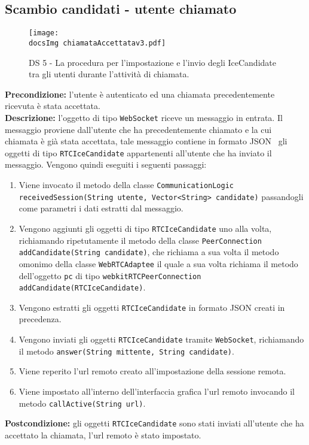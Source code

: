 \begin{sloppypar}
\subsection{Scambio candidati - utente chiamato}
\begin{center}
				\begin{figure}[h!tbp]
					\centering
					\texttt{[image: \\docsImg  chiamataAccettatav3.pdf]}
				\caption{DS 5 - La procedura per l'impostazione e l'invio degli IceCandidate tra gli utenti durante l'attività di chiamata.}	
				\end{figure}
			\end{center}
\noindent \textbf{Precondizione: }l'utente è autenticato ed una chiamata precedentemente ricevuta è stata accettata.\\
\textbf{Descrizione: }l'oggetto di tipo \texttt{WebSocket} riceve un messaggio in entrata. Il messaggio proviene dall'utente che ha precedentemente chiamato e la cui chiamata è già stata accettata, tale messaggio contiene in formato JSON\g~ gli oggetti di tipo \texttt{RTCIceCandidate} appartenenti all'utente che ha inviato il messaggio. Vengono quindi eseguiti i seguenti passaggi:
\begin{enumerate}
	\item Viene invocato il metodo della classe \texttt{CommunicationLogic receivedSession(String utente, Vector<String> candidate)} passandogli come parametri i dati estratti dal messaggio.
	\item Vengono aggiunti gli oggetti di tipo \texttt{RTCIceCandidate} uno alla volta, richiamando ripetutamente il metodo della classe \texttt{PeerConnection addCandidate(String candidate)}, che richiama a sua volta il metodo omonimo della classe \texttt{WebRTCAdaptee} il quale a sua volta richiama il metodo dell'oggetto \texttt{pc} di tipo \texttt{webkitRTCPeerConnection addCandidate(RTCIceCandidate)}.
	\item Vengono estratti gli oggetti \texttt{RTCIceCandidate} in formato JSON creati in precedenza.
	\item Vengono inviati gli oggetti \texttt{RTCIceCandidate} tramite \texttt{WebSocket}, richiamando il metodo \texttt{answer(String mittente, String candidate)}.
	\item Viene reperito l'url remoto creato all'impostazione della sessione remota.
	\item Viene impostato all'interno dell'interfaccia grafica l'url remoto invocando il metodo \texttt{callActive(String url)}.
\end{enumerate}
\textbf{Postcondizione: } gli oggetti \texttt{RTCIceCandidate} sono stati inviati all'utente che ha accettato la chiamata, l'url remoto è stato impostato.


\end{sloppypar}
